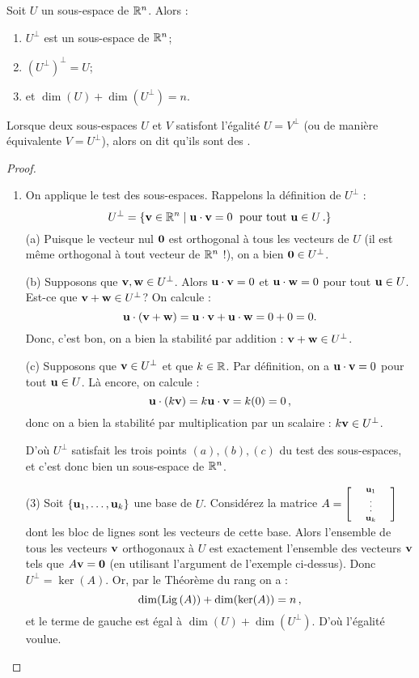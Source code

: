 \begin{theorem}\label{orthogcompprop}
Soit $U$ un sous-espace de $\mathbb{R}^n$.  Alors :
\begin{enumerate}[(1)]
\item $U^\perp$ est un sous-espace de $\mathbb{R}^n$;
\item $(U^\perp)^\perp = U$;
\item et $\dim(U) + \dim(U^\perp) = n$.
\end{enumerate}
Lorsque deux sous-espaces $U$ et $V$ satisfont l'égalité $U = V^\perp$ (ou de manière équivalente
$V = U^\perp$), alors on dit qu'ils sont des .
\end{theorem}

\begin{proof}
\begin{enumerate}[(1)]
	\item On applique le test des sous-espaces.  Rappelons la définition de $U^\perp$ :
$$
U^\perp = \{ \mathbf{v} \in \mathbb{R}^n \mid \mathbf{u} \cdot \mathbf{v} = 0 \textrm{\; pour tout $\mathbf{u}\in U$}\,.
 \}
$$
(a) Puisque le vecteur nul $\mathbf{0}$ est orthogonal à tous les vecteurs de $U$ (il est même orthogonal
à tout vecteur de $\mathbb{R}^n$ !), on a bien $\mathbf{0} \in U^\perp$. 

(b) Supposons que $\mathbf{v}, \mathbf{w}\in U^\perp$.  Alors $\mathbf{u} \cdot \mathbf{v}= 0$ et $\mathbf{u} \cdot \mathbf{w} =0$ pour tout $\mathbf{u}\in U$.  Est-ce que $\mathbf{v} + \mathbf{w} \in U^\perp$?  On calcule :
$$
\mathbf{u} \cdot (\mathbf{v} + \mathbf{w}) = \mathbf{u} \cdot \mathbf{v} + \mathbf{u} \cdot \mathbf{w} = 0 + 0 = 0.
$$
Donc, c'est bon, on a bien la stabilité par addition : $\mathbf{v} + \mathbf{w} \in U^\perp$. 

(c) Supposons que $\mathbf{v} \in U^\perp$ et que $k\in \mathbb{R}$.  Par définition, on a $\mathbf{u} \cdot \mathbf{v} = 0$ pour tout $\mathbf{u}\in U$.
L\`a encore, on calcule :
$$
\mathbf{u} \cdot (k\mathbf{v}) = k\mathbf{u} \cdot \mathbf{v} = k (0) = 0\,,
$$
donc on a bien la stabilité par multiplication par un scalaire : $k\mathbf{v} \in U^\perp$. 

D'o\`u $U^\perp$ satisfait les trois points $(a), (b), (c)$ du test des sous-espaces, et c'est donc bien un sous-espace de $\mathbb{R}^n$.


	\item[(3)] Soit $\{\mathbf{u}_1,\ldots, \mathbf{u}_k\}$ une base de $U$.
Considérez la matrice $ A=\scriptsize  \bmatrix ~&\uu_1&~\\&\vdots \\&\uu_k\endbmatrix$ dont les bloc de lignes sont les vecteurs de cette base.
Alors l'ensemble de tous les vecteurs $\mathbf{v}$ orthogonaux à $U$
est exactement l'ensemble des vecteurs $\mathbf{v}$ tels que $A\mathbf{v} = \mathbf{0}$
(en utilisant l'argument de l'exemple ci-dessus).  Donc $U^\perp = \ker(A)$.
Or, par le Théorème du rang on a :
$$
\dim(\operatorname{Lig\,}(A)) + \dim(\ker(A)) = n\,,
$$
et le terme de gauche est égal à $\dim(U) + \dim(U^\perp)$. D'où l'égalité voulue.


\end{enumerate}
\end{proof}
